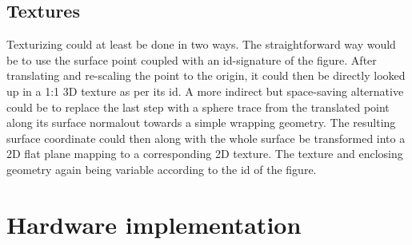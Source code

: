	\subsection{Textures}

	Texturizing could at least be done in two ways. The straightforward way would
	be to use the surface point coupled with an id-signature of the figure. After
	translating and re-scaling the point to the origin, it could then be directly
	looked up in a 1:1 3D texture as per its id. A more indirect but space-saving
	alternative could be to replace the last step with a sphere trace from the
	translated point along its surface normal\footnotemark out towards a simple
	wrapping geometry. The resulting surface coordinate could then along with the
	whole surface be transformed into a 2D flat plane mapping to a corresponding
	2D texture. The texture and enclosing geometry again being variable according
	to the id of the figure.


\section{Hardware implementation}
